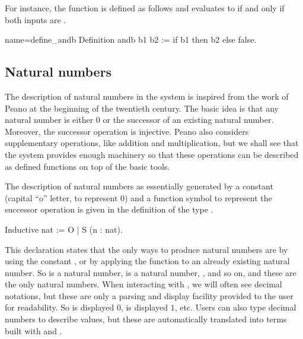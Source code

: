 For instance, the function  is defined as follows and
evaluates to  if and only if both inputs are .

\begin{coq}{name=define_andb}{}
Definition andb b1 b2 := if b1 then b2 else false.
\end{coq}


\subsection{Natural numbers}
The description of natural numbers in the \Coq{} system is inspired from
the work of Peano at the beginning of the twentieth century.  The
basic idea is that any natural number is either 0 or the successor of
an existing natural number.  Moreover, the successor operation is
injective.  Peano also considers supplementary operations, like
addition and multiplication, but we shall see that the \Coq{} system
provides enough machinery so that these operations can be described as
defined functions on top of the basic tools.

The description of natural numbers as essentially generated by a
constant  (capital ``o'' letter, to represent $0$) and a function symbol  to represent 
the successor operation is given in the definition of the type
.

\begin{coq}{}{}
Inductive nat := O | S (n : nat).
\end{coq}

This declaration states that the only ways to produce natural numbers
are by using the constant , or by applying the function  to
an already existing natural number.  So  is a natural number,
 is a
natural number, , and so on, and these are the only natural
numbers.  When interacting with \Coq{}, we will often see decimal
notations, but these are only a parsing and display
facility provided to the user for readability.  So  is displayed
$0$,  is displayed $1$, etc.  Users can also type decimal
numbers to describe values, but these are automatically translated into
terms built with  and .

